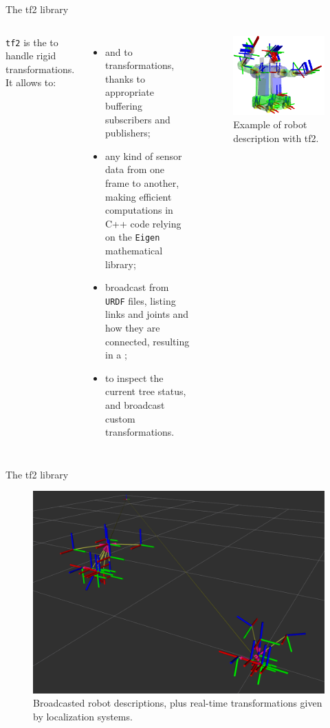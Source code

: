 \begin{frame}{The tf2 library}
	\begin{columns}
		\texttt{tf2} is the  to handle rigid transformations.\\
		\medskip
		It allows to:
		\begin{itemize}
			\item {} and  to transformations, thanks to appropriate buffering subscribers and publishers;
			\item {} any kind of sensor data from one frame to another, making efficient computations in C++ code relying on the \texttt{Eigen} mathematical library;
			\item broadcast  from \texttt{URDF} files, listing links and joints and how they are connected, resulting in a ;
			\item {} to inspect the current tree status, and broadcast custom transformations.
		\end{itemize}

		\begin{figure}
			\centering
			\includegraphics[width=.9\textwidth]{ros2_tf2}
			\caption{Example of robot description with tf2.}
			\label{fig:tf2example}
		\end{figure}
	\end{columns}
\end{frame}
\begin{frame}{The tf2 library}
	\begin{figure}
		\centering
		\includegraphics[width=.58\textwidth]{tfs}
		\caption{Broadcasted robot descriptions, plus real-time transformations given by localization systems.}
		\label{fig:tfs}
	\end{figure}
\end{frame}
